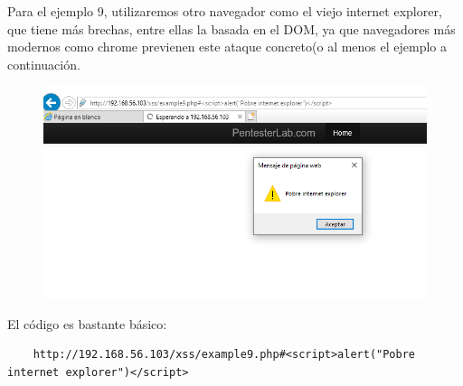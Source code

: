 \documentclass[12pt,a4paper,oneside,onecolumn]{article}
\begin{document}
    Para el ejemplo 9, utilizaremos otro navegador como el viejo internet explorer, que tiene m\'as brechas, entre ellas la basada en el DOM, ya que navegadores m\'as modernos como chrome previenen este ataque concreto(o al menos el ejemplo a continuaci\'on.
    \begin{figure}[!h]
		\centering
		\includegraphics[scale=0.6]{xss10.png}
		\caption{}
		\label{fig:2}
	\end{figure}
	El c\'odigo es bastante b\'asico:
	\begin{lstlisting}
    http://192.168.56.103/xss/example9.php#<script>alert("Pobre internet explorer")</script>
    \end{lstlisting}
\end{document}
